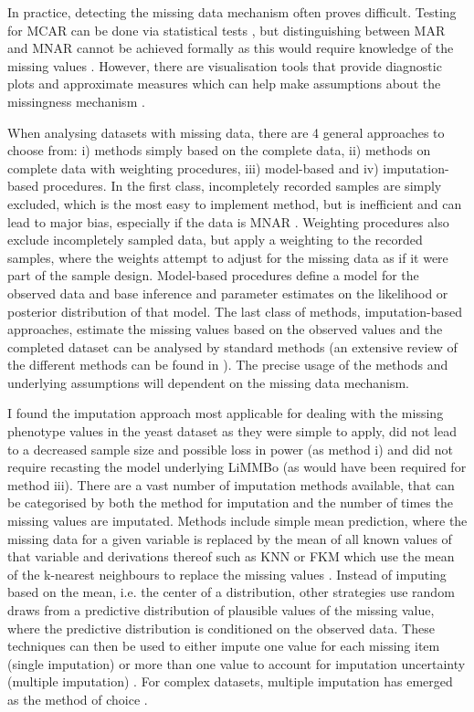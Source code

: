 In practice, detecting the missing data mechanism often proves difficult. Testing for MCAR can be done via statistical tests \citep{Little1988}, but distinguishing between MAR and MNAR cannot be achieved formally as this would require knowledge of the missing values \citep{Little2002,vanBuuren2011}. However, there are visualisation tools that provide diagnostic plots and approximate measures which can help make assumptions about the missingness mechanism \citep{Templ2012,Garson2015}. 

When analysing datasets with missing data, there are \num{4} general approaches to choose from:  i) methods simply based on the complete data, ii) methods on complete data with weighting procedures, iii) model-based and iv) imputation-based procedures. In the first class, incompletely recorded samples are simply excluded, which is the most easy to implement method, but is inefficient and can lead to major bias, especially if the data is MNAR \citep{Little2002}. Weighting procedures also exclude incompletely sampled data, but apply a weighting to the recorded samples, where the weights attempt to adjust for the missing data as if it were part of the sample design. Model-based procedures define a model for the observed data and base inference and parameter estimates on the likelihood or posterior distribution of that model. The last class of methods, imputation-based approaches, estimate the missing values based on the observed values and the completed dataset can be analysed by standard methods (an extensive review of the different methods can be found in \citep{Rubin2002}). The precise usage of the methods and underlying assumptions will dependent on the missing data mechanism. 

I found the imputation approach most applicable for dealing with the missing phenotype values in the yeast dataset as they were simple to apply, did not lead to a decreased sample size and possible loss in power (as method i) and did not require recasting the model underlying LiMMBo (as would have been required for method iii). There are a vast number of imputation methods available, that can be categorised by both the method for imputation and the number of times the missing values are imputated. Methods include simple mean prediction, where the missing data for a given variable is replaced by the mean of all known values of that variable and derivations thereof such as KNN or FKM which use the mean of the k-nearest neighbours to replace the missing values \citep{Troyanskaya200,Li2004}. Instead of imputing based on the mean, i.e. the center of a distribution, other strategies use random draws from a predictive distribution of plausible values of the missing value, where the predictive distribution is conditioned on the observed data. These techniques can then be used to either impute one value for each missing item (single imputation) or more than one value to account for imputation uncertainty (multiple imputation) \citep{Rubin2002}. For complex datasets, multiple imputation has emerged as the method of choice \citep{Rubin1987,Schafer1997}. 

